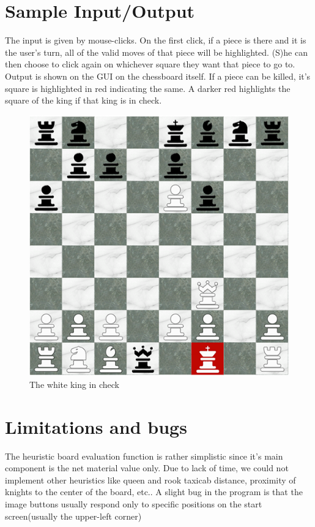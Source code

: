 \documentclass[11pt]{article}
\begin{document}
\section{Sample Input/Output}
The input is given by mouse-clicks. On the first click, if a piece is there and it is the user's turn, all of the valid moves of that piece will be highlighted. (S)he can then choose to click again on whichever square they want that piece to go to. Output is shown on the GUI on the chessboard itself. If a piece can be killed, it's square is highlighted in red indicating the same. A darker red highlights the square of the king if that king is in check.
\begin{figure}[h!]
	\caption{The white king in check}
	\centering
	\includegraphics{Snap1}
	\end{figure}

\section{Limitations and bugs}
The heuristic board evaluation function is rather simplistic since it's main component is the net material value only. Due to lack of time, we could not implement other heuristics like queen and rook taxicab distance, proximity of knights to the center of the board, etc.. A slight bug in the program is that the image buttons usually respond only to specific positions on the start screen(usually the upper-left corner)



 
\end{document}
